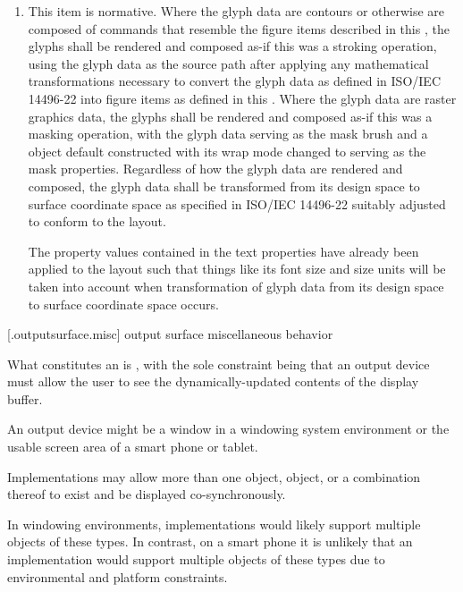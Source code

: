 \begin{enumerate}
\item This item is normative. Where the glyph data are contours or otherwise are composed of commands that resemble the figure items described in this \documenttypename, the glyphs shall be rendered and composed as-if this was a stroking operation, using the glyph data as the source path after applying any mathematical transformations necessary to convert the glyph data as defined in ISO/IEC 14496-22 into figure items as defined in this \documenttypename. Where the glyph data are raster graphics data, the glyphs shall be rendered and composed as-if this was a masking operation, with the glyph data serving as the mask brush and a  object default constructed with its wrap mode changed to  serving as the mask properties. Regardless of how the glyph data are rendered and composed, the glyph data shall be transformed from its design space to surface coordinate space as specified in ISO/IEC 14496-22 suitably adjusted to conform to the layout. \begin{note}
The property values contained in the text properties have already been applied to the layout such that things like its font size and size units will be taken into account when transformation of glyph data from its design space to surface coordinate space occurs.
\end{note}
\end{enumerate}

 [\iotwod.outputsurface.misc] {output surface miscellaneous behavior}

\pnum
What constitutes an  is , with the sole constraint being that an output device must allow the user to see the dynamically-updated contents of the display buffer.
\begin{example}
An output device might be a window in a windowing system environment or the usable screen area of a smart phone or tablet.
\end{example}

\pnum
Implementations may allow more than one  object,  object, or a combination thereof to exist and be displayed co-synchronously. \begin{note}
In windowing environments, implementations would likely support multiple objects of these types. In contrast, on a smart phone it is unlikely that an implementation would support multiple objects of these types due to environmental and platform constraints.
\end{note}

